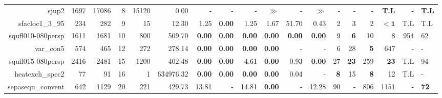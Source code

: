 \begin{table*}[t]
\begin{tabular}{|r|r|r|r|r||r||r|r|r|r|r||r|r|r|r|r|r|}
                             sjup2 &         1697 &         17086 &            8 &         15120 &                0.00 &              - &              - &              - & \textbf{$\gg$} &              - & \textbf{$\gg$} &                  - &                  - &                  - &       \textbf{T.L} &            - & \textbf{T.L} \\ 
                   sfacloc1\_3\_95 &          234 &           282 &            9 &            15 &               12.30 &           1.25 &  \textbf{0.00} &           1.25 &           1.67 &          51.70 &           0.43 &                  2 &                  3 &                  2 &         $\bm{< 1}$ &          T.L &          T.L \\ 
                 squfl010-080persp &         1611 &          1681 &           10 &           800 &              509.70 &  \textbf{0.00} &  \textbf{0.00} &  \textbf{0.00} &  \textbf{0.00} &  \textbf{0.00} &  \textbf{0.00} &                  9 &         \textbf{6} &                 10 &                  8 &          954 &           62 \\ 
                         var\_con5 &          574 &           465 &           12 &           272 &              278.14 &  \textbf{0.00} &  \textbf{0.00} &  \textbf{0.00} &  \textbf{0.00} &              - &              - &                  6 &                 28 &         \textbf{5} &                647 &            - &            - \\ 
                 squfl015-080persp &         2416 &          2481 &           15 &          1200 &              402.48 &  \textbf{0.00} &  \textbf{0.00} &           4.61 &  \textbf{0.00} &           0.93 &  \textbf{0.00} &                 27 &        \textbf{23} &                259 &        \textbf{23} &          T.L &           94 \\ 
                   heatexch\_spec2 &           77 &            91 &           16 &             1 &           634976.32 &  \textbf{0.00} &  \textbf{0.00} &  \textbf{0.00} &  \textbf{0.00} &           0.04 &              - &         \textbf{8} &                 15 &         \textbf{8} &                 12 &          T.L &            - \\ 
                 sepasequ\_convent &          642 &          1129 &           20 &           221 &              429.73 &          13.81 &              - &          14.81 &  \textbf{0.00} &              - &          12.28 &                 90 &                  - &                806 &               1151 &            - &  \textbf{72} \\ 

\end{tabular}
\end{table*}
